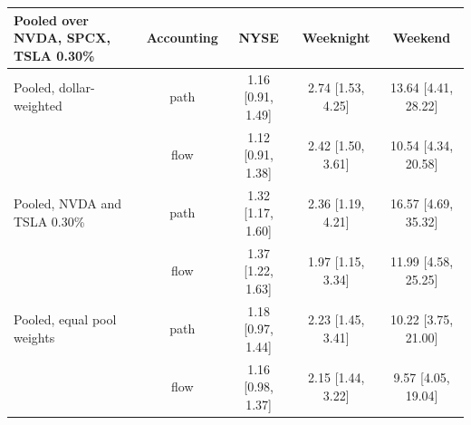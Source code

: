 \begin{tabular}{lcccc}
\toprule
Pooled over NVDA, SPCX, TSLA 0.30\% & Accounting & NYSE & Weeknight & Weekend \\
\midrule
Pooled, dollar-weighted & path & 1.16 [0.91, 1.49] & 2.74 [1.53, 4.25] & 13.64 [4.41, 28.22] \\
 & flow & 1.12 [0.91, 1.38] & 2.42 [1.50, 3.61] & 10.54 [4.34, 20.58] \\
Pooled, NVDA and TSLA 0.30\% & path & 1.32 [1.17, 1.60] & 2.36 [1.19, 4.21] & 16.57 [4.69, 35.32] \\
 & flow & 1.37 [1.22, 1.63] & 1.97 [1.15, 3.34] & 11.99 [4.58, 25.25] \\
Pooled, equal pool weights & path & 1.18 [0.97, 1.44] & 2.23 [1.45, 3.41] & 10.22 [3.75, 21.00] \\
 & flow & 1.16 [0.98, 1.37] & 2.15 [1.44, 3.22] & 9.57 [4.05, 19.04] \\
\bottomrule
\end{tabular}
